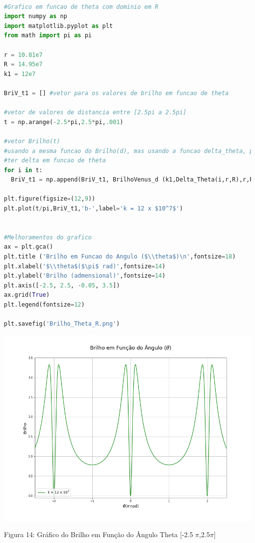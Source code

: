 \documentclass[a4paper, 12pt]{article}
\begin{document}
\begin{lstlisting}[language=Python, caption=Gráfico Brilho de Vênus ($\theta$), label=listing_grafico_B(theta)] 

#Grafico em funcao de theta com dominio em R
import numpy as np
import matplotlib.pyplot as plt
from math import pi as pi

r = 10.81e7
R = 14.95e7
k1 = 12e7

BriV_t1 = [] #vetor para os valores de brilho em funcao de theta 

#vetor de valores de distancia entre [2.5pi a 2.5pi] 
t = np.arange(-2.5*pi,2.5*pi,.001)

#vetor Brilho(t)
#usando a mesma funcao do Brilho(d), mas usando a funcao delta_theta, para 
#ter delta em funcao de theta
for i in t:
  BriV_t1 = np.append(BriV_t1, BrilhoVenus_d (k1,Delta_Theta(i,r,R),r,R)) #k = 12e7

plt.figure(figsize=(12,9))
plt.plot(t/pi,BriV_t1,'b-',label='k = 12 x $10^7$')


#Melhoramentos do grafico
ax = plt.gca()
plt.title ('Brilho em Funcao do Angulo ($\\theta$)\n',fontsize=18)
plt.xlabel('$\\theta$($\pi$ rad)',fontsize=14)
plt.ylabel('Brilho (admensional)',fontsize=14)
plt.axis([-2.5, 2.5, -0.05, 3.5])
ax.grid(True)
plt.legend(fontsize=12)

plt.savefig('Brilho_Theta_R.png')

\end{lstlisting}

\begin{center}
    \includegraphics[width=16cm]{14-Brilho_Theta_R.png}
    
    Figura 14: Gráfico do Brilho em Função do Ângulo Theta [-2.5 $\pi$,2.5$\pi$]
    
\end{center}
 
\end{document}
